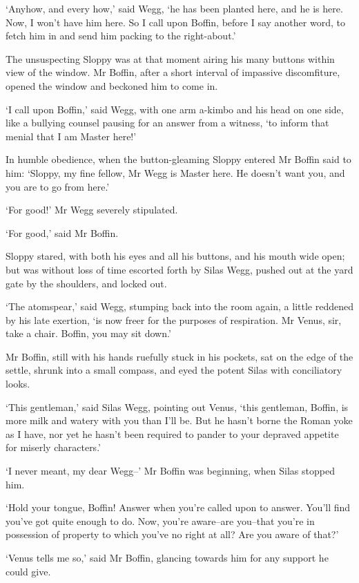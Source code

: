 ‘Anyhow, and every how,’ said Wegg, ‘he has been planted here, and he
is here. Now, I won’t have him here. So I call upon Boffin, before I say
another word, to fetch him in and send him packing to the right-about.’

The unsuspecting Sloppy was at that moment airing his many buttons
within view of the window. Mr Boffin, after a short interval of
impassive discomfiture, opened the window and beckoned him to come in.

‘I call upon Boffin,’ said Wegg, with one arm a-kimbo and his head on
one side, like a bullying counsel pausing for an answer from a witness,
‘to inform that menial that I am Master here!’

In humble obedience, when the button-gleaming Sloppy entered Mr Boffin
said to him: ‘Sloppy, my fine fellow, Mr Wegg is Master here. He doesn’t
want you, and you are to go from here.’

‘For good!’ Mr Wegg severely stipulated.

‘For good,’ said Mr Boffin.

Sloppy stared, with both his eyes and all his buttons, and his mouth
wide open; but was without loss of time escorted forth by Silas Wegg,
pushed out at the yard gate by the shoulders, and locked out.

‘The atomspear,’ said Wegg, stumping back into the room again, a
little reddened by his late exertion, ‘is now freer for the purposes of
respiration. Mr Venus, sir, take a chair. Boffin, you may sit down.’

Mr Boffin, still with his hands ruefully stuck in his pockets, sat on
the edge of the settle, shrunk into a small compass, and eyed the potent
Silas with conciliatory looks.

‘This gentleman,’ said Silas Wegg, pointing out Venus, ‘this gentleman,
Boffin, is more milk and watery with you than I’ll be. But he hasn’t
borne the Roman yoke as I have, nor yet he hasn’t been required to
pander to your depraved appetite for miserly characters.’

‘I never meant, my dear Wegg--’ Mr Boffin was beginning, when Silas
stopped him.

‘Hold your tongue, Boffin! Answer when you’re called upon to answer.
You’ll find you’ve got quite enough to do. Now, you’re aware--are
you--that you’re in possession of property to which you’ve no right at
all? Are you aware of that?’

‘Venus tells me so,’ said Mr Boffin, glancing towards him for any
support he could give.

